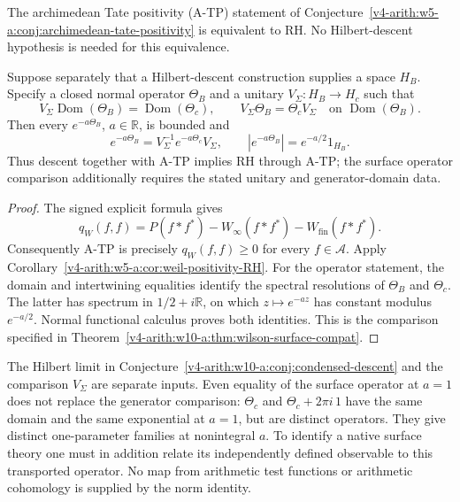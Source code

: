 \begin{theorem}
\label{v4-arith:w10-final:thm:cs-descent-atp-rh}
The archimedean Tate positivity (A-TP) statement of
Conjecture~\ref{v4-arith:w5-a:conj:archimedean-tate-positivity} is equivalent
to RH. No Hilbert-descent hypothesis is needed for this equivalence.

Suppose separately that a Hilbert-descent construction supplies a
space $H_B$. Specify a closed normal operator $\Theta_B$ and a unitary
$V_\Sigma:H_B\to H_c$ such that
\[
 V_\Sigma\operatorname{Dom}(\Theta_B)=\operatorname{Dom}(\Theta_c),
 \qquad V_\Sigma\Theta_B=\Theta_cV_\Sigma
 \quad\text{on }\operatorname{Dom}(\Theta_B).
\]
Then every $e^{-a\Theta_B}$, $a\in\mathbb R$, is bounded and
\[
 e^{-a\Theta_B}=V_\Sigma^{-1}e^{-a\Theta_c}V_\Sigma,
 \qquad |e^{-a\Theta_B}|=e^{-a/2}1_{H_B}.
\]
Thus descent together with A-TP implies RH through A-TP; the surface
operator comparison additionally requires the stated unitary and
generator-domain data.
\end{theorem}

\begin{proof}
The signed explicit formula gives
\[
 q_W(f,f)=P(f*f^*)-W_\infty(f*f^*)-W_{\mathrm{fin}}(f*f^*).
\]
Consequently A-TP is precisely $q_W(f,f)\ge0$ for every
$f\in\mathscr A$. Apply
Corollary~\ref{v4-arith:w5-a:cor:weil-positivity-RH}.
For the operator statement, the domain and intertwining equalities
identify the spectral resolutions of $\Theta_B$ and $\Theta_c$.
The latter has spectrum in $1/2+i\mathbb R$, on which
$z\mapsto e^{-az}$ has constant modulus $e^{-a/2}$.
Normal functional calculus proves both identities.
This is the comparison specified in
Theorem~\ref{v4-arith:w10-a:thm:wilson-surface-compat}.
\end{proof}

\begin{remark}
\label{v4-arith:w10-final:rem:w10-a-shape}
The Hilbert limit in
Conjecture~\ref{v4-arith:w10-a:conj:condensed-descent} and the comparison
$V_\Sigma$ are separate inputs. Even equality of the surface operator
at $a=1$ does not replace the generator comparison:
$\Theta_c$ and $\Theta_c+2\pi i\,1$ have the same domain and the same
exponential at $a=1$, but are distinct operators. They give distinct
one-parameter families at nonintegral $a$. To identify a native
surface theory one must in addition relate its independently defined
observable to this transported operator. No map from arithmetic test
functions or arithmetic cohomology is supplied by the norm identity.
\end{remark}

